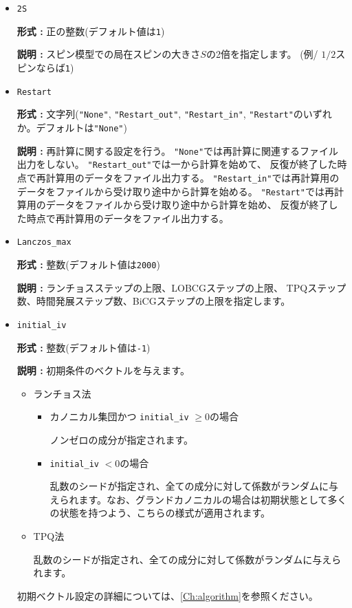\begin{itemize}
\item \verb|2S|

{\bf 形式 :} 正の整数(デフォルト値は\verb|1|)

{\bf 説明 :} スピン模型での局在スピンの大きさ$S$の2倍を指定します。
(例/ $1/2$スピンならば\verb|1|)

\item \verb|Restart|

  {\bf 形式 :} 文字列(\verb|"None"|, \verb|"Restart_out"|, \verb|"Restart_in"|,  
  \verb|"Restart"|のいずれか。デフォルトは\verb|"None"|)

  {\bf 説明 :} 再計算に関する設定を行う。
  \verb|"None"|では再計算に関連するファイル出力をしない。
  \verb|"Restart_out"|では一から計算を始めて、
  反復が終了した時点で再計算用のデータをファイル出力する。
  \verb|"Restart_in"|では再計算用のデータをファイルから受け取り途中から計算を始める。
  \verb|"Restart"|では再計算用のデータをファイルから受け取り途中から計算を始め、
  反復が終了した時点で再計算用のデータをファイル出力する。

\item \verb|Lanczos_max|

{\bf 形式 :} 整数(デフォルト値は\verb|2000|)

{\bf 説明 :} ランチョスステップの上限、LOBCGステップの上限、
TPQステップ数、時間発展ステップ数、BiCGステップの上限を指定します。

\item \verb|initial_iv|

{\bf 形式 :} 整数(デフォルト値は\verb|-1|)

{\bf 説明 :}  {初期条件のベクトルを与えます。}
\begin{itemize}
\item{ランチョス法}
\begin{itemize}
\item{カノニカル集団かつ \verb|initial_iv| $\geq 0$の場合}

ノンゼロの成分が指定されます。

\item{ \verb|initial_iv| $< 0$の場合}

乱数のシードが指定され、全ての成分に対して係数がランダムに与えられます。なお、グランドカノニカルの場合は初期状態として多くの状態を持つよう、こちらの様式が適用されます。
\end{itemize}

\item{TPQ法}

乱数のシードが指定され、全ての成分に対して係数がランダムに与えられます。
\end{itemize}
初期ベクトル設定の詳細については、\ref{Ch:algorithm}を参照ください。


\end{itemize}
